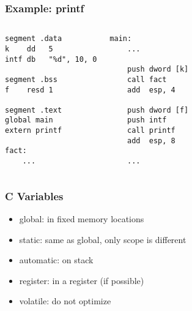 \documentclass[dvipsnames]{beamer}
\begin{document}
\begin{frame}[fragile]
  \frametitle{Example: printf}

  \begin{columns}[t]
    \begin{lstlisting}
segment .data
k    dd   5
intf db   "%d", 10, 0

segment .bss
f    resd 1

segment .text
global main
extern printf

fact:
    ...
    \end{lstlisting}

    \begin{lstlisting}
main:
    ...

    push dword [k]
    call fact
    add  esp, 4

    push dword [f]
    push intf
    call printf
    add  esp, 8

    ...
    \end{lstlisting}
  \end{columns}
\end{frame}

\begin{frame}
  \frametitle{C Variables}

  \begin{itemize}
    \item global: in fixed memory locations
    \item static: same as global, only scope is different
    \item automatic: on stack
    \item register: in a register (if possible)
    \item volatile: do not optimize
  \end{itemize}
\end{frame}
\end{document}
